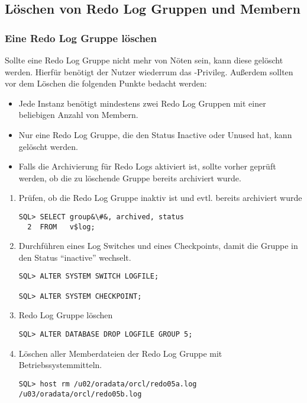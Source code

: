       \subsection{L\"oschen von Redo Log Gruppen und Membern}
        \subsubsection{Eine Redo Log Gruppe l\"oschen}
          Sollte eine Redo Log Gruppe nicht mehr von N\"oten sein, kann diese gel\"oscht werden. Hierf\"ur ben\"otigt der Nutzer wiederrum das -Privileg. Au\ss erdem sollten vor dem L\"oschen die folgenden Punkte bedacht werden:
          \begin{itemize}
            \item Jede Instanz ben\"otigt mindestens zwei Redo Log Gruppen mit einer beliebigen Anzahl von Membern.
            \item Nur eine Redo Log Gruppe, die den Status Inactive oder Unused hat, kann gel\"oscht werden.
            \item Falls die Archivierung f\"ur Redo Logs aktiviert ist, sollte vorher gepr\"uft werden, ob die zu l\"oschende Gruppe bereits archiviert wurde.
          \end{itemize}
\clearpage
            \begin{enumerate}
              \item Pr\"ufen, ob die Redo Log Gruppe inaktiv ist und evtl. bereits archiviert wurde
                \begin{lstlisting}[caption={Status der Redo Logs pr\"ufen},label=admin40,language=oracle_sql]
SQL> SELECT group&\#&, archived, status
  2  FROM   v$log;
                \end{lstlisting}
              \item Durchf\"uhren eines Log Switches und eines Checkpoints, damit die Gruppe in den Status \enquote{inactive} wechselt.
                \begin{lstlisting}[caption={Log Switch + Checkpoint durchf\"uhren},label=admin41,language=oracle_sql]
SQL> ALTER SYSTEM SWITCH LOGFILE;

SQL> ALTER SYSTEM CHECKPOINT;
                \end{lstlisting}
              \item Redo Log Gruppe l\"oschen
              \begin{lstlisting}[caption={Log Gruppe l\"oschen},label=admin42,language=oracle_sql]
SQL> ALTER DATABASE DROP LOGFILE GROUP 5;
                \end{lstlisting}
              \item L\"oschen aller Memberdateien der Redo Log Gruppe mit Betriebssystemmitteln.
              \begin{lstlisting}[caption={Log Gruppe l\"oschen},label=admin42a,language=sqlplus]
SQL> host rm /u02/oradata/orcl/redo05a.log /u03/oradata/orcl/redo05b.log
                \end{lstlisting}
            \end{enumerate}
